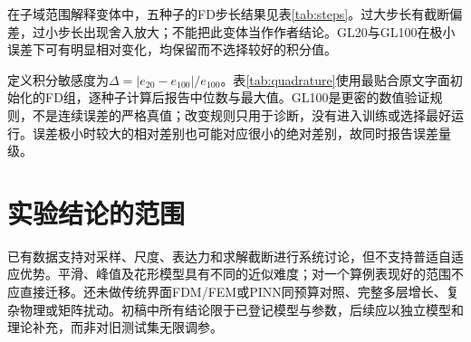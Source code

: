 在子域范围解释变体中，五种子的FD步长结果见表\ref{tab:steps}。过大步长有截断偏差，过小步长出现舍入放大；不能把此变体当作作者结论。GL20与GL100在极小误差下可有明显相对变化，均保留而不选择较好的积分值。
\begin{table}[htbp]\centering\caption{FD步长独立诊断，$m=160,N=1000$}\label{tab:steps}\end{table}

定义积分敏感度为$\Delta=|e_{20}-e_{100}|/e_{100}$。表\ref{tab:quadrature}使用最贴合原文字面初始化的FD组，逐种子计算后报告中位数与最大值。GL100是更密的数值验证规则，不是连续误差的严格真值；改变规则只用于诊断，没有进入训练或选择最好运行。误差极小时较大的相对差别也可能对应很小的绝对差别，故同时报告误差量级。
\begin{table}[htbp]\centering\caption{花形界面误差对积分规则的敏感度，十种子}\label{tab:quadrature}\resizebox{\textwidth}{!}{}\end{table}

\section{实验结论的范围}
已有数据支持对采样、尺度、表达力和求解截断进行系统讨论，但不支持普适自适应优势。平滑、峰值及花形模型具有不同的近似难度；对一个算例表现好的范围不应直接迁移。还未做传统界面FDM/FEM或PINN同预算对照、完整多层增长、复杂物理或矩阵扰动。初稿中所有结论限于已登记模型与参数，后续应以独立模型和理论补充，而非对旧测试集无限调参。
